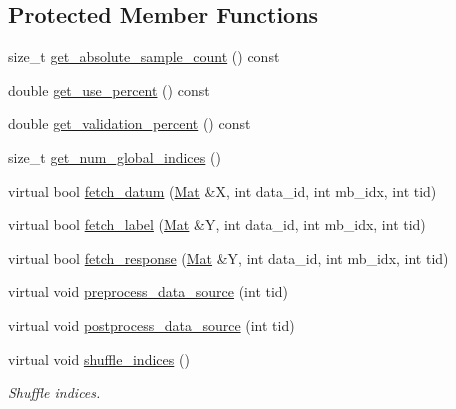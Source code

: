 \subsection*{Protected Member Functions}
\begin{DoxyCompactItemize}
\item 
size\+\_\+t \hyperlink{classlbann_1_1generic__data__reader_a1e8655cd1883d850566694bcf2ad60ab}{get\+\_\+absolute\+\_\+sample\+\_\+count} () const
\item 
double \hyperlink{classlbann_1_1generic__data__reader_a5853fa5e619b886699954aca6440dd8a}{get\+\_\+use\+\_\+percent} () const
\item 
double \hyperlink{classlbann_1_1generic__data__reader_ab06058b5fa1d74239998358b02f73132}{get\+\_\+validation\+\_\+percent} () const
\item 
size\+\_\+t \hyperlink{classlbann_1_1generic__data__reader_ab35b0f96c84c20b9bab5dda1aa852953}{get\+\_\+num\+\_\+global\+\_\+indices} ()
\item 
virtual bool \hyperlink{classlbann_1_1generic__data__reader_a0a3cd87ed4a7057df185e0087f2d21c1}{fetch\+\_\+datum} (\hyperlink{base_8hpp_a68f11fdc31b62516cb310831bbe54d73}{Mat} \&X, int data\+\_\+id, int mb\+\_\+idx, int tid)
\item 
virtual bool \hyperlink{classlbann_1_1generic__data__reader_a03627408c1d1aa28691d31232fe1dce5}{fetch\+\_\+label} (\hyperlink{base_8hpp_a68f11fdc31b62516cb310831bbe54d73}{Mat} \&Y, int data\+\_\+id, int mb\+\_\+idx, int tid)
\item 
virtual bool \hyperlink{classlbann_1_1generic__data__reader_abe544ea807eed477f3636010d199b574}{fetch\+\_\+response} (\hyperlink{base_8hpp_a68f11fdc31b62516cb310831bbe54d73}{Mat} \&Y, int data\+\_\+id, int mb\+\_\+idx, int tid)
\item 
virtual void \hyperlink{classlbann_1_1generic__data__reader_ad613f95666b973d8da77773fb34c9b66}{preprocess\+\_\+data\+\_\+source} (int tid)
\item 
virtual void \hyperlink{classlbann_1_1generic__data__reader_a7bbf74725a96235dc1cd20ff440a69bd}{postprocess\+\_\+data\+\_\+source} (int tid)
\item 
virtual void \hyperlink{classlbann_1_1generic__data__reader_af1aaa4d1a693974c1b1f1318b6ed60b8}{shuffle\+\_\+indices} ()
\begin{DoxyCompactList}\small\item\em Shuffle indices. \end{DoxyCompactList}\end{DoxyCompactItemize}
